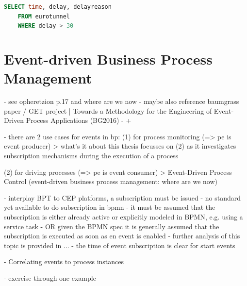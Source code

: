 
\begin{lstlisting}[language=sql,caption={Sample Query in Esper EPL},label=lst:epl-query-example]
	SELECT time, delay, delayreason
	FROM eurotunnel
	WHERE delay > 30
\end{lstlisting}

\section{Event-driven Business Process Management}
- see opheretzion p.17 and where are we now
- maybe also reference baumgrass paper / GET project | Towards a Methodology for the Engineering
of Event-Driven Process Applications (BG2016)
- + 

- there are 2 use cases for events in bp: 
(1) for process monitoring (=> pe is event producer)
> what's it about
this thesis focusses on (2) as it investigates subscription mechanisms during the execution of a process

(2) for driving processes (=> pe is event consumer)
> Event-Driven Process Control (event-driven business process management: where are we now)

- interplay BPT to CEP platforms, a subscription must be issued
- no standard yet available to do subscription in bpmn
- it must be assumed that the subscription is either already active or explicitly modeled in BPMN, e.g. using a service task
- OR given the BPMN spec it is generally assumed that the subscription is executed as soon as en event is enabled
- further analysis of this topic is provided in ...
- the time of event subscription is clear for start events

- Correlating events to process instances

- exercise through one example



